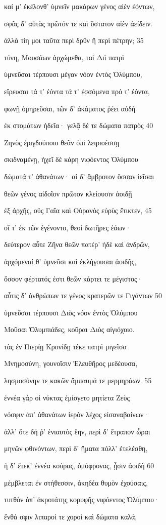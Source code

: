 καί μ' ἐκέλονθ' ὑμνεῖν μακάρων γένος αἰὲν ἐόντων,

σφᾶς δ' αὐτὰς πρῶτόν τε καὶ ὕστατον αἰὲν ἀείδειν.

ἀλλὰ τίη μοι ταῦτα περὶ δρῦν ἢ περὶ πέτρην; 35 

τύνη, Μουσάων ἀρχώμεθα, ταὶ Διὶ πατρὶ

ὑμνεῦσαι τέρπουσι μέγαν νόον ἐντὸς Ὀλύμπου,

εἴρευσαι τά τ' ἐόντα τά τ' ἐσσόμενα πρό τ' ἐόντα,

φωνῇ ὁμηρεῦσαι, τῶν δ' ἀκάματος ῥέει αὐδὴ 

ἐκ στομάτων ἡδεῖα· γελᾷ δέ τε δώματα πατρὸς 40 

Ζηνὸς ἐριγδούποιο θεᾶν ὀπὶ λειριοέσσῃ

σκιδναμένῃ, ἠχεῖ δὲ κάρη νιφόεντος Ὀλύμπου 

δώματά τ' ἀθανάτων· αἱ δ' ἄμβροτον ὄσσαν ἱεῖσαι 

θεῶν γένος αἰδοῖον πρῶτον κλείουσιν ἀοιδῇ

ἐξ ἀρχῆς, οὓς Γαῖα καὶ Οὐρανὸς εὐρὺς ἔτικτεν, 45

οἵ τ' ἐκ τῶν ἐγένοντο, θεοὶ δωτῆρες ἐάων· 

δεύτερον αὖτε Ζῆνα θεῶν πατέρ' ἠδὲ καὶ ἀνδρῶν, 

ἀρχόμεναί θ' ὑμνεῦσι καὶ ἐκλήγουσαι ἀοιδῆς,

ὅσσον φέρτατός ἐστι θεῶν κάρτει τε μέγιστος·

αὖτις δ' ἀνθρώπων τε γένος κρατερῶν τε Γιγάντων 50

ὑμνεῦσαι τέρπουσι Διὸς νόον ἐντὸς Ὀλύμπου

Μοῦσαι Ὀλυμπιάδες, κοῦραι Διὸς αἰγιόχοιο.

τὰς ἐν Πιερίῃ Κρονίδῃ τέκε πατρὶ μιγεῖσα

Μνημοσύνη, γουνοῖσιν Ἐλευθῆρος μεδέουσα,

λησμοσύνην τε κακῶν ἄμπαυμά τε μερμηράων. 55

ἐννέα γάρ οἱ νύκτας ἐμίσγετο μητίετα Ζεὺς

νόσφιν ἀπ' ἀθανάτων ἱερὸν λέχος εἰσαναβαίνων·

ἀλλ' ὅτε δή ῥ' ἐνιαυτὸς ἔην, περὶ δ' ἔτραπον ὧραι

μηνῶν φθινόντων, περὶ δ' ἤματα πόλλ' ἐτελέσθη,

ἡ δ' ἔτεκ' ἐννέα κούρας, ὁμόφρονας, ᾗσιν ἀοιδὴ 60 

μέμβλεται ἐν στήθεσσιν, ἀκηδέα θυμὸν ἐχούσαις,

τυτθὸν ἀπ' ἀκροτάτης κορυφῆς νιφόεντος Ὀλύμπου·

ἔνθά σφιν λιπαροί τε χοροὶ καὶ δώματα καλά,

